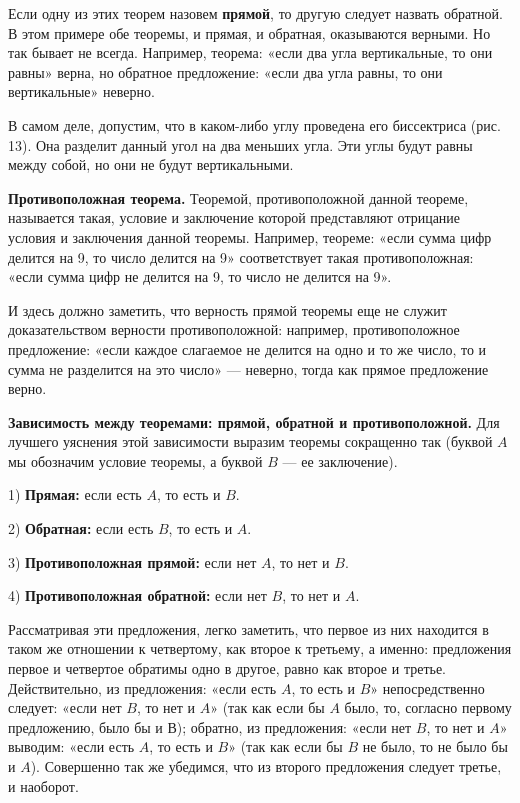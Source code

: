 \documentclass[oneside]{book}
\begin{document}
Если одну из этих теорем назовем \textbf{прямой}, то другую следует назвать обратной.
В этом примере обе теоремы, и прямая, и обратная, оказываются верными.
Но так бывает не всегда.
Например, теорема:
«если два угла вертикальные, то они равны» верна, но обратное предложение:
«если два угла равны, то они вертикальные» неверно.

В самом деле, допустим, что в каком-либо углу проведена его биссектриса (рис. 13).
Она разделит данный угол на два меньших угла.
Эти углы будут равны между собой, но они не будут вертикальными.

\textbf{Противоположная теорема.}
Теоремой, противоположной данной теореме, называется такая, условие и заключение которой представляют отрицание условия и заключения данной теоремы.
Например, теореме:
«если сумма цифр делится на 9, то число делится на 9» соответствует такая противоположная:
«если сумма цифр не делится на 9, то число не делится на 9».

И здесь должно заметить, что верность прямой теоремы еще не служит доказательством верности противоположной:
например, противоположное предложение:
«если каждое слагаемое не делится на одно и то же число, то и сумма не разделится на это число» — неверно, тогда как прямое предложение верно.

\textbf{Зависимость между теоремами: прямой, обратной и противоположной.}
Для лучшего уяснения этой зависимости выразим теоремы сокращенно так (буквой $A$ мы обозначим условие теоремы, а буквой $B$ — ее заключение).

1) \textbf{Прямая:}
если есть $A$, то есть и $B$.

2) \textbf{Обратная:}
если есть $B$, то есть и $A$.

3) \textbf{Противоположная прямой:}
если нет $A$, то нет и $B$.

4) \textbf{Противоположная обратной:}
если нет $B$, то нет и $A$.

Рассматривая эти предложения, легко заметить, что первое из них находится в таком же отношении к четвертому, как второе к третьему, а именно:
предложения первое и четвертое обратимы одно в другое, равно как второе и третье.
Действительно, из предложения:
«если есть $A$, то есть и $B$» непосредственно следует:
«если нет $B$, то нет и $A$» (так как если бы $A$ было, то, согласно первому предложению, было бы и В);
обратно, из предложения:
«если нет $B$, то нет и $A$» выводим:
«если есть $A$, то есть и $B$» (так как если бы $B$ не было, то не было бы и $A$).
Совершенно так же убедимся, что из второго предложения следует третье, и наоборот.
\end{document}
